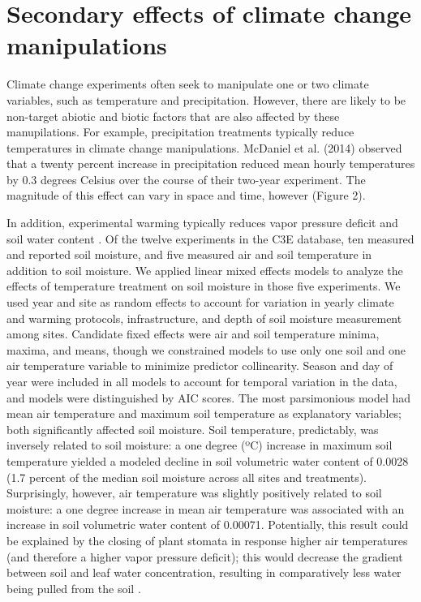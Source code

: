 \documentclass{article}
\begin{document}
\section* {Secondary effects of climate change manipulations}
Climate change experiments often seek to manipulate one or two climate variables, such as temperature and precipitation. However, there are likely to be non-target abiotic and biotic factors that are also affected by these manupilations. For example, precipitation treatments typically reduce temperatures in climate change manipulations\citep{sherry2007,rollinson2012,mcdaniel2014}. McDaniel et al. (2014) observed that a twenty percent increase in precipitation reduced mean hourly temperatures by 0.3 degrees Celsius over the course of their two-year experiment. The magnitude of this effect can vary in space and time, however (Figure 2). 
\par In addition, experimental warming typically reduces vapor pressure deficit and soil water content \citep[e.g. Figure 3S][]{sherry2007,morin2010,templer2016}. Of the twelve experiments in the C3E database, ten measured and reported soil moisture, and five measured air and soil temperature in addition to soil moisture. We applied linear mixed effects models to analyze the effects of temperature treatment on soil moisture in those five experiments. We used year and site as random effects to account for variation in yearly climate and warming protocols, infrastructure, and depth of soil moisture measurement among sites. Candidate fixed effects were air and soil temperature minima, maxima, and means, though we constrained models to use only one soil and one air temperature variable to minimize predictor collinearity. Season and day of year were included in all models to account for temporal variation in the data, and models were distinguished by AIC scores. The most parsimonious model had mean air temperature and maximum soil temperature as explanatory variables; both significantly affected soil moisture. Soil temperature, predictably, was inversely related to soil moisture: a one degree (ºC) increase in maximum soil temperature yielded a modeled decline in soil volumetric water content of 0.0028 (1.7 percent of the median soil moisture across all sites and treatments). Surprisingly, however, air temperature was slightly positively related to soil moisture: a one degree increase in mean air temperature was associated with an increase in soil volumetric water content of 0.00071. Potentially, this result could be explained by the closing of plant stomata in response higher air temperatures (and therefore a higher vapor pressure deficit); this would decrease the gradient between soil and leaf water concentration, resulting in comparatively less water being pulled from the soil \citep{williams2015}. 
\end{document}
